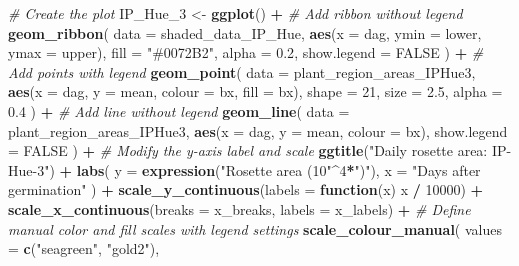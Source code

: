 \documentclass[
  11pt,
]{article}
\newenvironment{Shaded}{\begin{snugshade}}{\end{snugshade}}
\newcommand{\AttributeTok}[1]{\textcolor[rgb]{0.13,0.29,0.53}{#1}}
\newcommand{\CommentTok}[1]{\textcolor[rgb]{0.56,0.35,0.01}{\textit{#1}}}
\newcommand{\ConstantTok}[1]{\textcolor[rgb]{0.56,0.35,0.01}{#1}}
\newcommand{\ControlFlowTok}[1]{\textcolor[rgb]{0.13,0.29,0.53}{\textbf{#1}}}
\newcommand{\DecValTok}[1]{\textcolor[rgb]{0.00,0.00,0.81}{#1}}
\newcommand{\FloatTok}[1]{\textcolor[rgb]{0.00,0.00,0.81}{#1}}
\newcommand{\FunctionTok}[1]{\textcolor[rgb]{0.13,0.29,0.53}{\textbf{#1}}}
\newcommand{\NormalTok}[1]{#1}
\newcommand{\OtherTok}[1]{\textcolor[rgb]{0.56,0.35,0.01}{#1}}
\newcommand{\SpecialCharTok}[1]{\textcolor[rgb]{0.81,0.36,0.00}{\textbf{#1}}}
\newcommand{\StringTok}[1]{\textcolor[rgb]{0.31,0.60,0.02}{#1}}
\begin{document}
\begin{Shaded}
\begin{Highlighting}[]
\CommentTok{\# Create the plot}
\NormalTok{IP\_Hue\_3 }\OtherTok{\textless{}{-}} \FunctionTok{ggplot}\NormalTok{() }\SpecialCharTok{+}
  \CommentTok{\# Add ribbon without legend}
  \FunctionTok{geom\_ribbon}\NormalTok{(}
    \AttributeTok{data =}\NormalTok{ shaded\_data\_IP\_Hue,}
    \FunctionTok{aes}\NormalTok{(}\AttributeTok{x =}\NormalTok{ dag, }\AttributeTok{ymin =}\NormalTok{ lower, }\AttributeTok{ymax =}\NormalTok{ upper),}
    \AttributeTok{fill =} \StringTok{"\#0072B2"}\NormalTok{, }\AttributeTok{alpha =} \FloatTok{0.2}\NormalTok{,}
    \AttributeTok{show.legend =} \ConstantTok{FALSE}
\NormalTok{  ) }\SpecialCharTok{+}
  \CommentTok{\# Add points with legend}
  \FunctionTok{geom\_point}\NormalTok{(}
    \AttributeTok{data =}\NormalTok{ plant\_region\_areas\_IPHue3,}
    \FunctionTok{aes}\NormalTok{(}\AttributeTok{x =}\NormalTok{ dag, }\AttributeTok{y =}\NormalTok{ mean, }\AttributeTok{colour =}\NormalTok{ bx, }\AttributeTok{fill =}\NormalTok{ bx),}
    \AttributeTok{shape =} \DecValTok{21}\NormalTok{, }\AttributeTok{size =} \FloatTok{2.5}\NormalTok{, }\AttributeTok{alpha =} \FloatTok{0.4}
\NormalTok{  ) }\SpecialCharTok{+}
  \CommentTok{\# Add line without legend}
  \FunctionTok{geom\_line}\NormalTok{(}
    \AttributeTok{data =}\NormalTok{ plant\_region\_areas\_IPHue3,}
    \FunctionTok{aes}\NormalTok{(}\AttributeTok{x =}\NormalTok{ dag, }\AttributeTok{y =}\NormalTok{ mean, }\AttributeTok{colour =}\NormalTok{ bx),}
    \AttributeTok{show.legend =} \ConstantTok{FALSE}
\NormalTok{  ) }\SpecialCharTok{+}
  \CommentTok{\# Modify the y{-}axis label and scale}
  \FunctionTok{ggtitle}\NormalTok{(}\StringTok{"Daily rosette area: IP{-}Hue{-}3"}\NormalTok{) }\SpecialCharTok{+}
  \FunctionTok{labs}\NormalTok{(}
    \AttributeTok{y =} \FunctionTok{expression}\NormalTok{(}\StringTok{"Rosette area (10"}\SpecialCharTok{\^{}}\DecValTok{4}\SpecialCharTok{*}\StringTok{")"}\NormalTok{), }
    \AttributeTok{x =} \StringTok{"Days after germination"}
\NormalTok{  ) }\SpecialCharTok{+}
  \FunctionTok{scale\_y\_continuous}\NormalTok{(}\AttributeTok{labels =} \ControlFlowTok{function}\NormalTok{(x) x }\SpecialCharTok{/} \DecValTok{10000}\NormalTok{) }\SpecialCharTok{+}
  \FunctionTok{scale\_x\_continuous}\NormalTok{(}\AttributeTok{breaks =}\NormalTok{ x\_breaks, }\AttributeTok{labels =}\NormalTok{ x\_labels) }\SpecialCharTok{+}
  \CommentTok{\# Define manual color and fill scales with legend settings}
  \FunctionTok{scale\_colour\_manual}\NormalTok{(}
    \AttributeTok{values =} \FunctionTok{c}\NormalTok{(}\StringTok{"seagreen"}\NormalTok{, }\StringTok{"gold2"}\NormalTok{),}

\end{Highlighting}
\end{Shaded}
\end{document}
